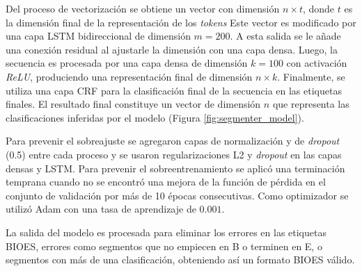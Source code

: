 \documentclass[a4paper,11pt,twocolumn,twoside]{article}
\begin{document}
Del proceso de vectorización se obtiene un vector con dimensión $n \times t$, donde $t$ es la dimensión final de la representación
de los \textit{tokens}  Este vector es modificado por una capa LSTM bidireccional de dimensión $m=200$. A esta salida se le 
añade una conexión residual al ajustarle la dimensión con una capa densa. Luego, la secuencia es procesada por una 
capa densa de dimensión $k=100$ con activación \textit{ReLU}, produciendo una representación final de dimensión 
$n \times k$. Finalmente, se utiliza una capa CRF
para la clasificación final de la secuencia en las etiquetas finales. El resultado final constituye un vector
de dimensión $n$ que representa las clasificaciones inferidas por el modelo (Figura \ref{fig:segmenter_model}).

Para prevenir el sobreajuste se agregaron capas de normalización y de \textit{dropout} (0.5) entre cada proceso y se usaron regularizaciones
L2 y \textit{dropout} en las capas densas y LSTM. 
Para prevenir el sobreentrenamiento se aplicó una 
terminación temprana cuando no se encontró una mejora de la función de pérdida en el conjunto de validación
por más de 10 épocas consecutivas. Como optimizador se utilizó Adam con una tasa de aprendizaje de $0.001$.

La salida del modelo es procesada para eliminar los errores en las etiquetas BIOES, errores como segmentos 
que no empiecen en B o terminen en E, o segmentos con más de una clasificación, 
obteniendo así un formato BIOES válido.

\end{document}

